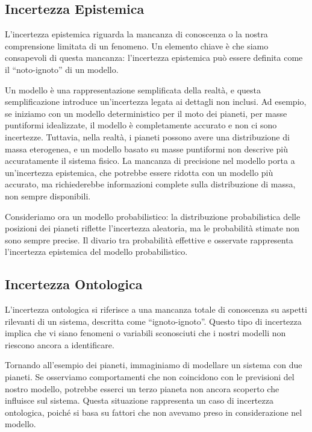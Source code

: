 \documentclass[
  letterpaper,
  krantz2]{{[}./krantz{]}}
\begin{document}
\subsection{Incertezza Epistemica}\label{incertezza-epistemica}

L'incertezza epistemica riguarda la mancanza di conoscenza o la nostra
comprensione limitata di un fenomeno. Un elemento chiave è che siamo
consapevoli di questa mancanza: l'incertezza epistemica può essere
definita come il ``noto-ignoto'' di un modello.

Un modello è una rappresentazione semplificata della realtà, e questa
semplificazione introduce un'incertezza legata ai dettagli non inclusi.
Ad esempio, se iniziamo con un modello deterministico per il moto dei
pianeti, per masse puntiformi idealizzate, il modello è completamente
accurato e non ci sono incertezze. Tuttavia, nella realtà, i pianeti
possono avere una distribuzione di massa eterogenea, e un modello basato
su masse puntiformi non descrive più accuratamente il sistema fisico. La
mancanza di precisione nel modello porta a un'incertezza epistemica, che
potrebbe essere ridotta con un modello più accurato, ma richiederebbe
informazioni complete sulla distribuzione di massa, non sempre
disponibili.

Consideriamo ora un modello probabilistico: la distribuzione
probabilistica delle posizioni dei pianeti riflette l'incertezza
aleatoria, ma le probabilità stimate non sono sempre precise. Il divario
tra probabilità effettive e osservate rappresenta l'incertezza
epistemica del modello probabilistico.

\subsection{Incertezza Ontologica}\label{incertezza-ontologica}

L'incertezza ontologica si riferisce a una mancanza totale di conoscenza
su aspetti rilevanti di un sistema, descritta come ``ignoto-ignoto''.
Questo tipo di incertezza implica che vi siano fenomeni o variabili
sconosciuti che i nostri modelli non riescono ancora a identificare.

Tornando all'esempio dei pianeti, immaginiamo di modellare un sistema
con due pianeti. Se osserviamo comportamenti che non coincidono con le
previsioni del nostro modello, potrebbe esserci un terzo pianeta non
ancora scoperto che influisce sul sistema. Questa situazione rappresenta
un caso di incertezza ontologica, poiché si basa su fattori che non
avevamo preso in considerazione nel modello.
\end{document}

